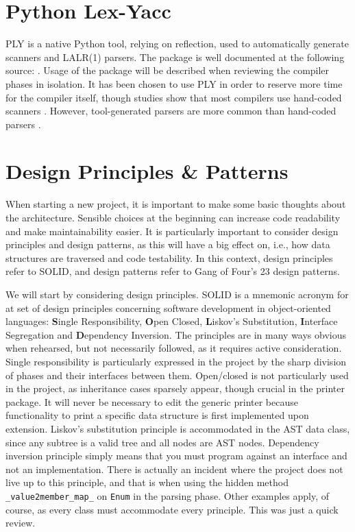 \section{Python Lex-Yacc}
PLY is a native Python tool, relying on reflection, used to automatically generate scanners and LALR(1) parsers. The package is well documented at the following source: \cite{ply}. Usage of the package will be described when reviewing the compiler phases in isolation. It has been chosen to use PLY in order to reserve more time for the compiler itself, though studies show that most compilers use hand-coded scanners \parencite[69]{EnginneringACompiler}. However, tool-generated parsers are more common than hand-coded parsers \parencite[85]{EnginneringACompiler}.

\section{Design Principles \& Patterns}
When starting a new project, it is important to make some basic thoughts about the architecture. Sensible choices at the beginning can increase code readability and make maintainability easier. It is particularly important to consider design principles and design patterns, as this will have a big effect on, i.e., how data structures are traversed and code testability. In this context, design principles refer to SOLID, and design patterns refer to Gang of Four's 23 design patterns.

We will start by considering design principles. SOLID is a mnemonic acronym for at set of design principles concerning software development in object-oriented languages: \textbf{S}ingle Responsibility, \textbf{O}pen Closed, \textbf{L}iskov's Substitution, \textbf{I}nterface Segregation and \textbf{D}ependency Inversion. The principles are in many ways obvious when rehearsed, but not necessarily followed, as it requires active consideration. Single responsibility is particularly expressed in the project by the sharp division of phases and their interfaces between them. Open/closed is not particularly used in the project, as inheritance cases sparsely appear, though crucial in the printer package. It will never be necessary to edit the generic printer because functionality to print a specific data structure is first implemented upon extension. Liskov's substitution principle is accommodated in the AST data class, since any subtree is a valid tree and all nodes are AST nodes. Dependency inversion principle simply means that you must program against an interface and not an implementation. There is actually an incident where the project does not live up to this principle, and that is when using the hidden method \texttt{\_value2member\_map\_} on \texttt{Enum} in the parsing phase. Other examples apply, of course, as every class must accommodate every principle. This was just a quick review.


